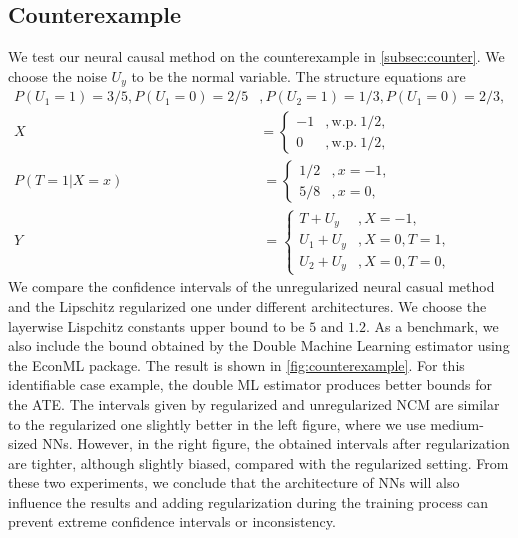 \subsection{Counterexample} \label{subsec:counter_test}

We test our neural causal method on the counterexample in \cref{subsec:counter}. We choose the noise $U_y$ to be the normal variable. The structure equations are 
\begin{align*}
P( U_{1} =1) =3/5, P(U_{1} =0) =2/5 & ,P( U_{2} =1) =1/3,P( U_{1} =0) =2/3,\\
X & =\begin{cases}
-1 & ,\text{w.p.} \ 1/2,\\
0 & ,\text{w.p.} \ 1/2,
\end{cases}\\
P( T=1|X=x) & \ =\begin{cases}
1/2 & ,x=-1,\\
5/8 & ,x=0,
\end{cases}\\
Y & \ =\begin{cases}
T+U_{y} & ,X=-1,\\
U_{1} +U_{y} & ,X=0,T=1,\\
U_{2} +U_{y} & ,X=0,T=0,
\end{cases}
\end{align*}
We compare the confidence intervals of the unregularized neural casual method and the Lipschitz regularized one under different architectures. We choose the layerwise Lispchitz constants upper bound to be $5$ and $1.2$. As a benchmark, we also include the bound obtained by the Double Machine Learning estimator using the EconML package. The result is shown in \cref{fig:counterexample}. For this identifiable case example, the double ML estimator produces better bounds for the ATE. The intervals given by regularized and unregularized NCM are similar to the regularized one slightly better in the left figure, where we use medium-sized NNs. However, in the right figure, the obtained intervals after regularization are tighter, although slightly biased, compared with the regularized setting. From these two experiments, we conclude that the architecture of NNs will also influence the results and adding regularization during the training process can prevent extreme confidence intervals or inconsistency. 


